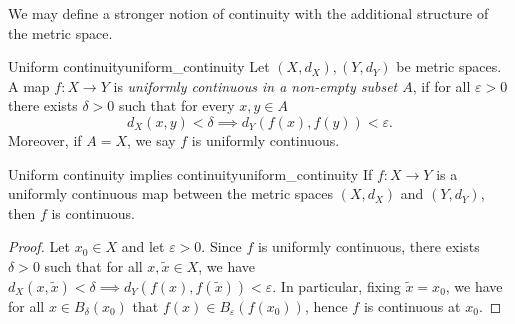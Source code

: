 We may define a stronger notion of continuity with the additional structure of the metric space.
\begin{definition}{Uniform continuity}{uniform_continuity}
    Let \((X, d_X), (Y, d_Y)\) be metric spaces. A map \(f : X \to Y\) is \emph{uniformly continuous in a non-empty subset \(A\)}, if for all \(\varepsilon > 0\) there exists \(\delta > 0\) such that for every \(x,y \in A\)
    \begin{equation*}
        d_X(x, y) < \delta \implies d_Y(f(x), f(y)) < \varepsilon.
    \end{equation*}
    Moreover, if \(A = X\), we say \(f\) is uniformly continuous.
\end{definition}

\begin{proposition}{Uniform continuity implies continuity}{uniform_continuity}
    If \(f : X \to Y\) is a uniformly continuous map between the metric spaces \((X, d_X)\) and \((Y, d_Y)\), then \(f\) is continuous.
\end{proposition}
\begin{proof}
    Let \(x_0 \in X\) and let \(\varepsilon > 0\). Since \(f\) is uniformly continuous, there exists \(\delta > 0\) such that for all \(x,\tilde{x} \in X\), we have \(d_X(x, \tilde{x}) < \delta \implies d_Y(f(x), f(\tilde{x})) < \varepsilon\). In particular, fixing \(\tilde{x} = x_0\), we have for all \(x \in B_\delta(x_0)\) that \(f(x) \in B_\varepsilon(f(x_0))\), hence \(f\) is continuous at \(x_0\).
\end{proof}

